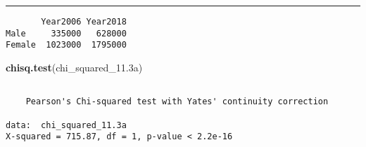 \documentclass[
]{article}
\newenvironment{Shaded}{\begin{snugshade}}{\end{snugshade}}
\newcommand{\DataTypeTok}[1]{\textcolor[rgb]{0.13,0.29,0.53}{#1}}
\newcommand{\DecValTok}[1]{\textcolor[rgb]{0.00,0.00,0.81}{#1}}
\newcommand{\FloatTok}[1]{\textcolor[rgb]{0.00,0.00,0.81}{#1}}
\newcommand{\KeywordTok}[1]{\textcolor[rgb]{0.13,0.29,0.53}{\textbf{#1}}}
\newcommand{\NormalTok}[1]{#1}
\newcommand{\OperatorTok}[1]{\textcolor[rgb]{0.81,0.36,0.00}{\textbf{#1}}}
\newcommand{\StringTok}[1]{\textcolor[rgb]{0.31,0.60,0.02}{#1}}
\begin{document}
\begin{center}\rule{0.5\linewidth}{0.5pt}\end{center}

\begin{Shaded}
\end{Shaded}

\begin{verbatim}
       Year2006 Year2018
Male     335000   628000
Female  1023000  1795000
\end{verbatim}

\begin{Shaded}
\begin{Highlighting}[]
\KeywordTok{chisq.test}\NormalTok{(chi_squared_}\FloatTok{11.3}\NormalTok{a)}
\end{Highlighting}
\end{Shaded}

\begin{verbatim}

    Pearson's Chi-squared test with Yates' continuity correction

data:  chi_squared_11.3a
X-squared = 715.87, df = 1, p-value < 2.2e-16
\end{verbatim}
\end{document}
